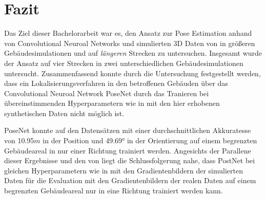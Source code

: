 
\section{Fazit}
\label{sec:kapitel_6}
Das Ziel dieser Bachelorarbeit war es, den Ansatz zur Pose Estimation anhand von Convolutional Neuroal Networks und simulierten 3D Daten von \citet{acharyaBIMPoseNetIndoorCamera2019} in größeren Gebäudesimulationen und auf \textit{längeren} Strecken zu untersuchen.
Insgesamt wurde der Ansatz auf vier Strecken in zwei unterschiedlichen Gebäudesimulationen untersucht. Zusammenfassend konnte durch die Untersuchung festgestellt werden, dass ein Lokalisierungsverfahren in den betroffenen Gebäuden über das Convolutional Neuroal Network PoseNet durch das Tranieren bei übereinstimmenden Hyperparametern wie in \cite{acharyaBIMPoseNetIndoorCamera2019} mit den hier erhobenen synthetischen Daten nicht möglich ist. 

PoseNet konnte auf den Datensätzen mit einer durchschnittlichen Akkuratesse von 10.95$m$ in der Position und 49.69° in der Orientierung auf einem begrenzten Gebäudeareal in nur einer Richtung trainiert werden. Angesichts der Parallene dieser Ergebnisse und den von \citet{acharyaBIMPoseNetIndoorCamera2019} liegt die Schlussfolgerung nahe, dass PostNet bei gleichen Hyperparametern wie in \cite{acharyaBIMPoseNetIndoorCamera2019} mit den Gradientenbildern der simulierten Daten für die Evaluation mit den Gradientenbildern der realen Daten auf einem begrenzten Gebäudeareal nur in eine Richtung trainiert werden kann.